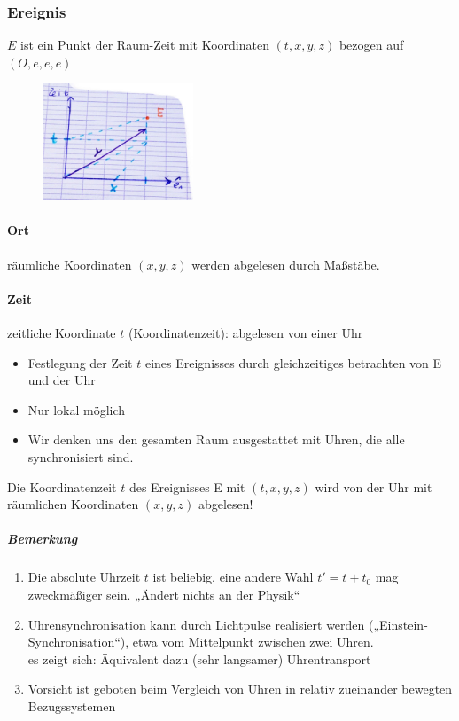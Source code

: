 \subsubsection{Ereignis}
$E$ ist ein Punkt der Raum-Zeit mit Koordinaten $(t,x,y,z)$ bezogen auf $(O,e,e,e)$
\begin{figure}[h]
\begin{center}
\includegraphics[width=0.4\textwidth]{Skizzen/Anhang10.jpg}
\end{center}
\caption{}
\end{figure}
\paragraph*{Ort}
räumliche Koordinaten $(x,y,z)$ werden abgelesen durch Maßstäbe.
\paragraph*{Zeit}
zeitliche Koordinate $t$ (Koordinatenzeit): abgelesen von einer Uhr\\
\begin{itemize}
\item Festlegung der Zeit $t$ eines Ereignisses durch gleichzeitiges betrachten von E und der Uhr
\item Nur lokal möglich
\item Wir denken uns den gesamten Raum ausgestattet mit Uhren, die alle synchronisiert sind.\\
\end{itemize}
Die Koordinatenzeit $t$ des Ereignisses E mit $(t,x,y,z)$ wird von der Uhr mit räumlichen Koordinaten $(x,y,z)$ abgelesen!

\subparagraph*{Bemerkung} 
\begin{enumerate}
\item Die absolute Uhrzeit $t$ ist beliebig, eine andere Wahl $t'=t+t_0$ mag zweckmäßiger sein. „Ändert nichts an der Physik“
\item Uhrensynchronisation kann durch Lichtpulse realisiert werden („Einstein-Synchronisation“), etwa vom Mittelpunkt zwischen zwei Uhren.\\
es zeigt sich: Äquivalent dazu (sehr langsamer) Uhrentransport
\item Vorsicht ist geboten beim Vergleich von Uhren in relativ zueinander bewegten Bezugssystemen
\end{enumerate}

